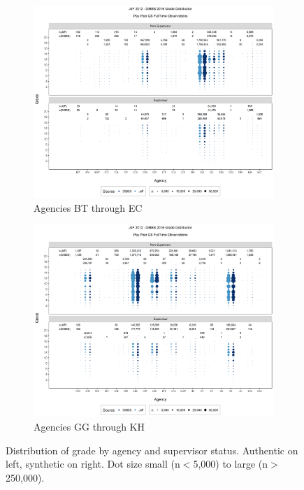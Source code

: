 \documentclass[10pt, letterpaper]{article}
\begin{document}
\begin{spacing}{1.0}
\clearpage

\begin{figure}[]
    \centering
    \begin{subfigure}{1\textwidth}
        \centering
        \includegraphics[width=6in, trim={0 0.55in 0 0.75in}, clip]{JdFDIBBSGSFullTimeGradeSupervisoryStatusAgency21.png}
        \caption{Agencies BT through EC}
        \vspace{10pt}
    \end{subfigure}
    \begin{subfigure}{1\textwidth}
        \centering
        \includegraphics[width=6in, trim={0 0.55in 0 0.75in}, clip]{JdFDIBBSGSFullTimeGradeSupervisoryStatusAgency61.png}
        \caption{Agencies GG through KH}
    \end{subfigure}
    \caption{Distribution of grade by agency and supervisor status.  Authentic on left, synthetic on right.  Dot size small (n$<$5,000) to large (n$>$250,000).}
    \label{figure:JdFDIBBSGSFullTimeGradeSupervisoryStatusAgency}
\end{figure}


\end{spacing}
\end{document}
